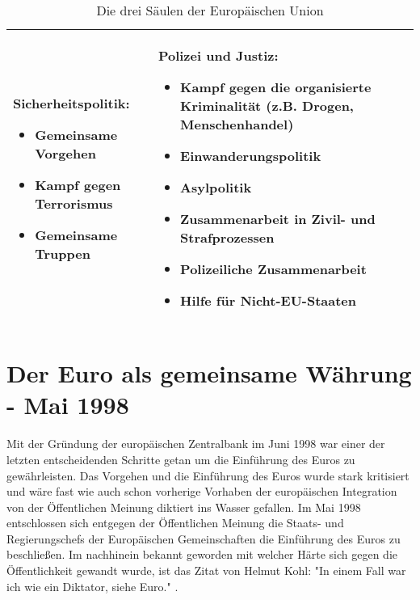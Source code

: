 \documentclass[12pt, oneside]{book} %
\begin{document}
\begin{table}[H]
\begin{tabular}{|p{5cm}|p{5cm}|p{5cm}|}
\vspace{0.2cm}

\textbf{Sicherheitspolitik:}
{\renewcommand{\labelitemi}{$\bullet$}
\begin{itemize}[leftmargin=*]
    \item Gemeinsame Vorgehen
    \item Kampf gegen Terrorismus
    \item Gemeinsame Truppen
\end{itemize}}

&

\textbf{Polizei und Justiz:}
{\renewcommand{\labelitemi}{$\bullet$}
\begin{itemize}[leftmargin=*]
    \item Kampf gegen die organisierte Kriminalität (z.B. Drogen, Menschenhandel)
    \item Einwanderungspolitik
    \item Asylpolitik
    \item Zusammenarbeit in Zivil- und Strafprozessen
    \item Polizeiliche Zusammenarbeit
    \item Hilfe für Nicht-EU-Staaten
\end{itemize}}
\\
\hline

\end{tabular}
\caption{Die drei Säulen der Europäischen Union}
\label{tab:eu_saeulen}
\end{table}

\section{Der Euro als gemeinsame Währung - Mai 1998}
Mit der Gründung der europäischen Zentralbank im Juni 1998 war einer der letzten entscheidenden Schritte getan um die Einführung des Euros zu gewährleisten. Das Vorgehen und die Einführung des Euros wurde stark kritisiert und wäre fast wie auch schon vorherige Vorhaben der europäischen Integration von der Öffentlichen Meinung diktiert ins Wasser gefallen\parencite[]{Interstests-and-Integration}. Im Mai 1998 entschlossen sich entgegen der Öffentlichen Meinung die Staats- und Regierungschefs der Europäischen Gemeinschaften die Einführung des Euros zu beschließen. Im nachhinein bekannt geworden mit welcher Härte sich gegen die Öffentlichkeit gewandt wurde, ist das Zitat von Helmut Kohl: "In einem Fall war ich wie ein Diktator, siehe Euro."  \parencite[]{Helmut-Kohl-Zitat}.
\end{document}
